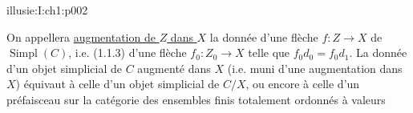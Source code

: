 \begin{illusiebodypage}{illusie:I:ch1:p002}
\hypertarget{illusie:I:ch1:s1:1:eq3}{}%
\noindent{}\par

\hypertarget{illusie:I:ch1:s1:1:p5}{}%
On appellera \underline{augmentation de $Z$ dans $X$} la donnée d'une flèche
$f:Z\longrightarrow X$ de $\operatorname{Simpl}(C)$, i.e. (1.1.3) d'une flèche
$f_0:Z_0\longrightarrow X$ telle que $f_0d_0=f_0d_1$. La donnée d'un objet
simplicial de $C$ augmenté dans $X$ (i.e. muni d'une augmentation dans $X$)
équivaut à celle d'un objet simplicial de $C/X$, ou encore à celle d'un
préfaisceau sur la catégorie des ensembles finis totalement ordonnés à valeurs
\end{illusiebodypage}
